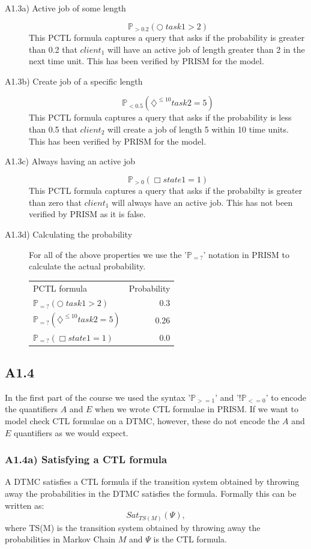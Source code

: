 \documentclass[12pt]{report}
\begin{document}
\begin{description}
\item[A1.3a) Active job of some length]
$$\mathbb{P}_{> 0.2}(\bigcirc \; task1 > 2)$$
This PCTL formula captures a query that asks if the probability is greater than 0.2 that $client_1$ will have an active job of length greater than 2 in the next time unit. This has been verified by PRISM for the model.


\item[A1.3b) Create job of a specific length]
$$\mathbb{P}_{< 0.5}(\diamondsuit^{\leq 10} task2=5)$$
This PCTL formula captures a query that asks if the probability is less than 0.5 that $client_2$ will create a job of length 5 within 10 time units. This has been verified by PRISM for the model.


\item[A1.3c) Always having an active job]
$$\mathbb{P}_{> 0}(\Box state1=1)$$
This PCTL formula captures a query that asks if the probabilty is greater than zero that $client_1$ will always have an active job. This has not been verified by PRISM as it is false.


\item[A1.3d) Calculating the probability]
For all of the above properties we use the '$\mathbb{P}_{=?}$' notation in PRISM to calculate the actual probability.
\begin{center}
\begin{tabular}{l r}
PCTL formula & Probability\\
$\mathbb{P}_{=?}(\bigcirc \; task1> 2)$ & 0.3\\
$\mathbb{P}_{=?}(\diamondsuit^{\leq10} task2=5)$ & 0.26\\
$\mathbb{P}_{=?}(\Box state1=1)$ & 0.0\\
\end{tabular}
\end{center}

\end{description}

\subsection*{A1.4}
In the first part of the course we used the syntax '$\mathbb{P}_{>=1}$' and '$!\mathbb{P}_{<=0}$' to encode the quantifiers $A$ and $E$ when we wrote CTL formulae in PRISM. If we want to model check CTL formulae on a DTMC, however, these do not encode the $A$ and $E$ quantifiers as we would expect.

\subsubsection*{A1.4a) Satisfying a CTL formula}
A DTMC satisfies a CTL formula if the transition system obtained by throwing away the probabilities in the DTMC satisfies the formula. Formally this can be written as:
$$Sat_{TS(M)}(\Psi),$$
where TS(M) is the transition system obtained by throwing away the probabilities in Markov Chain $M$ and $\Psi$ is the CTL formula.
\end{document}
